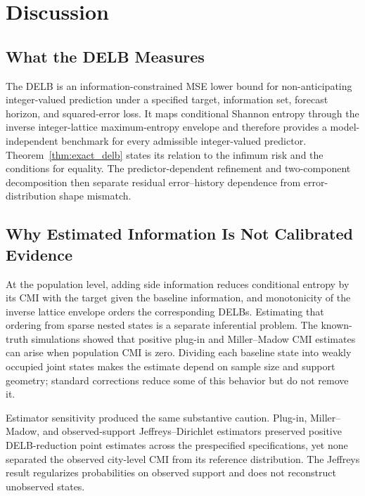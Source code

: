 \section{Discussion}
\label{sec:discussion}

\subsection{What the DELB Measures}
\label{subsec:discussion_rq1}

The DELB is an information-constrained MSE lower bound for non-anticipating
integer-valued prediction under a specified target, information set, forecast
horizon, and squared-error loss. It maps conditional Shannon entropy through
the inverse integer-lattice maximum-entropy envelope and therefore provides a
model-independent benchmark for every admissible integer-valued predictor.
Theorem~\ref{thm:exact_delb} states its relation to the infimum risk and the
conditions for equality. The predictor-dependent refinement and
two-component decomposition then separate residual error--history dependence
from error-distribution shape mismatch.

\subsection{Why Estimated Information Is Not Calibrated Evidence}
\label{subsec:discussion_rq2}

At the population level, adding side information reduces conditional entropy
by its CMI with the target given the baseline information, and monotonicity
of the inverse lattice envelope orders the corresponding DELBs. Estimating
that ordering from sparse nested states is a separate inferential problem.
The known-truth simulations showed that positive plug-in and
Miller--Madow CMI estimates can arise when population CMI is zero. Dividing
each baseline state into weakly occupied joint states makes the estimate
depend on sample size and support geometry; standard corrections reduce some
of this behavior but do not remove it.

Estimator sensitivity produced the same substantive caution. Plug-in,
Miller--Madow, and observed-support Jeffreys--Dirichlet estimators preserved
positive DELB-reduction point estimates across the prespecified
specifications, yet none separated the observed city-level CMI from its
reference distribution. The Jeffreys result regularizes probabilities on
observed support and does not reconstruct unobserved states.

